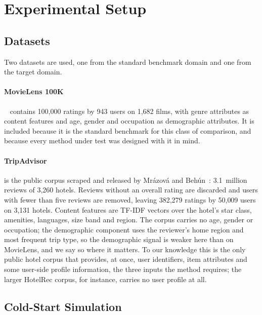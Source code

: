 \documentclass[runningheads]{llncs}
\begin{document}
\section{Experimental Setup}
\label{sec:setup}

\subsection{Datasets}

Two datasets are used, one from the standard benchmark domain and one from the target domain.

\paragraph{MovieLens 100K}~\cite{harper2015} contains 100{,}000 ratings by 943 users on 1{,}682 films, with genre attributes as content features and age, gender and occupation as demographic attributes. It is included because it is the standard benchmark for this class of comparison, and because every method under test was designed with it in mind.

\paragraph{TripAdvisor} is the public corpus scraped and released by Mr\'azov\'a and Beh\'un~\cite{mrazova2023}: 3.1~million reviews of 3{,}260 hotels. Reviews without an overall rating are discarded and users with fewer than five reviews are removed, leaving 382{,}279 ratings by 50{,}009 users on 3{,}131 hotels. Content features are TF-IDF vectors over the hotel's star class, amenities, languages, size band and region. The corpus carries no age, gender or occupation; the demographic component uses the reviewer's home region and most frequent trip type, so the demographic signal is weaker here than on MovieLens, and we say so where it matters. To our knowledge this is the only public hotel corpus that provides, at once, user identifiers, item attributes and some user-side profile information, the three inputs the method requires; the larger HotelRec corpus, for instance, carries no user profile at all.

\subsection{Cold-Start Simulation}
\end{document}
